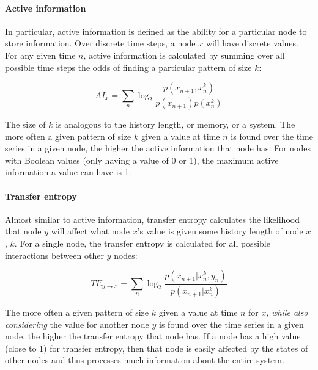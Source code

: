 \documentclass[twoside]{article}
\begin{document}
\begin{multicols}{2}
\paragraph{Active information}In particular, active information is defined as the ability for a particular node to store information. Over discrete time steps, a node $x$ will have discrete values. For any given time $n$, active information is calculated by summing over all possible time steps the odds of finding a particular pattern of size $k$:

\begin{equation}
AI_x = \sum_{n} \log_{2} \frac{p(x_{n+1}, x_{n}^{k})}{p(x_{n+1})p(x_{n}^{k})}
\end{equation}

The size of $k$ is analogous to the history length, or memory, or a system. The more often a given pattern of size $k$ given a value at time $n$ is found over the time series in a given node, the higher the active information that node has. For nodes with Boolean values (only having a value of 0 or 1), the maximum active information a value can have is 1.

\paragraph{Transfer entropy}Almost similar to active information, transfer entropy calculates the likelihood that node $y$ will affect what node $x$'s value is given some history length of node $x$, $k$. For a single node, the transfer entropy is calculated for all possible interactions between other $y$ nodes:

\begin{equation}
TE_{y \rightarrow x} = \sum_{n} \log_{2} \frac{p(x_{n+1} | x_{n}^{k}, y_{n})}{p(x_{n+1} | x_{n}^{k})}
\end{equation}

The more often a given pattern of size $k$ given a value at time $n$ for $x$, \textit{while also considering} the value for another node $y$ is found over the time series in a given node, the higher the transfer entropy that node has. If a node has a high value (close to 1) for transfer entropy, then that node is easily affected by the states of other nodes and thus processes much information about the entire system.


\end{multicols}
\end{document}
